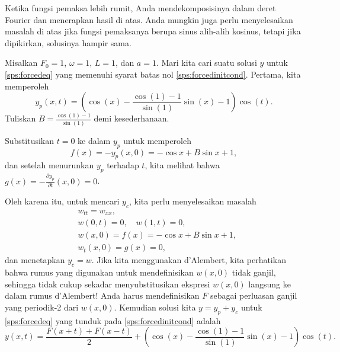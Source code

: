 Ketika fungsi pemaksa lebih rumit, Anda mendekomposisinya dalam
deret Fourier dan menerapkan hasil di atas.  Anda mungkin juga perlu menyelesaikan
masalah di atas jika fungsi pemaksanya berupa sinus alih-alih kosinus,
tetapi jika dipikirkan, solusinya hampir sama.

\begin{example}
Misalkan $F_0 = 1$, $\omega = 1$, $L=1$, dan $a=1$.
Mari kita cari suatu solusi $y$ untuk \eqref{sps:forcedeq}
yang memenuhi syarat batas nol
\eqref{sps:forcedinitcond}.  Pertama, kita memperoleh
\begin{equation*}
y_p(x,t) =
\left(
\cos (x) -
\frac{\cos (1) - 1}{\sin (1)}
\sin (x)
-1
\right)
\cos (t) .
\end{equation*}
Tuliskan $B = \frac{\cos (1) - 1}{\sin (1)}$ demi kesederhanaan.

Substitusikan $t=0$ ke dalam $y_p$ untuk memperoleh
\begin{equation*}
f(x) =- y_p(x,0) = 
- \cos x +
B \sin x
+1 ,
\end{equation*}
dan setelah menurunkan $y_p$ terhadap $t$, kita melihat bahwa 
$g(x) = -\frac{\partial y_p}{\partial t}(x,0) = 0$.

Oleh karena itu, untuk mencari $y_c$, kita perlu menyelesaikan masalah
\begin{align*}
& w_{tt} = w_{xx} , \\
& w(0,t) = 0 , \quad w(1,t) = 0 , \\
& w(x,0) = f(x) = - \cos x + B \sin x +1 , \\
& w_t(x,0) = g(x) = 0 ,
\end{align*}
dan menetapkan $y_c=w$.
Jika kita menggunakan d'Alembert, kita perhatikan bahwa
rumus yang digunakan untuk mendefinisikan $w(x,0)$ tidak ganjil,
sehingga tidak cukup sekadar menyubstitusikan ekspresi $w(x,0)$
langsung ke dalam rumus
d'Alembert!  Anda harus mendefinisikan $F$ sebagai perluasan ganjil yang periodik-2
dari $w(x,0)$.  Kemudian solusi kita $y = y_p+y_c$ untuk
\eqref{sps:forcedeq} yang tunduk pada \eqref{sps:forcedinitcond}
adalah
\begin{equation} \label{natfreq:exsol}
y(x,t) = 
\frac{F(x+t) + F(x-t)}{2} + 
\left(
\cos (x) -
\frac{\cos (1) - 1}{\sin (1)}
\sin (x)
-1
\right)
\cos (t) .
\end{equation}


\end{example}
